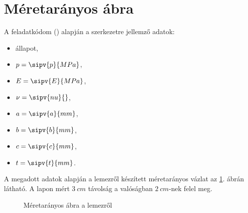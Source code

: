 \section{Méretarányos ábra}

A feladatkódom (\texttt{})
alapján a szerkezetre jellemző adatok:
\begin{myframe}
  \vspace{-.66em}
  \begin{multicols}{2}
    \begin{itemize}
      \item {} állapot,
      \item $p = \sipv{p}{MPa}$,
      \item $E = \sipv{E}{MPa}$,
      \item $\nu = \sipv{nu}{}$,

      \item $a = \sipv{a}{mm}$,
      \item $b = \sipv{b}{mm}$,
      \item $c = \sipv{c}{mm}$,
      \item $t = \sipv{t}{mm}$.
    \end{itemize}
  \end{multicols}
\end{myframe}

A megadott adatok alapján a lemezről készített méretarányos vázlat az
\ref{fig:construction}. ábrán látható. A lapon mért $\SI{3}{cm}$ távolság
a valóságban $\SI{2}{cm}$-nek felel meg.

\begin{figure}[H]
  \centering
  
  \vspace{-2mm}
  \caption{Méretarányos ábra a lemezről}
  \vspace{-5mm}
  \label{fig:construction}
\end{figure}
